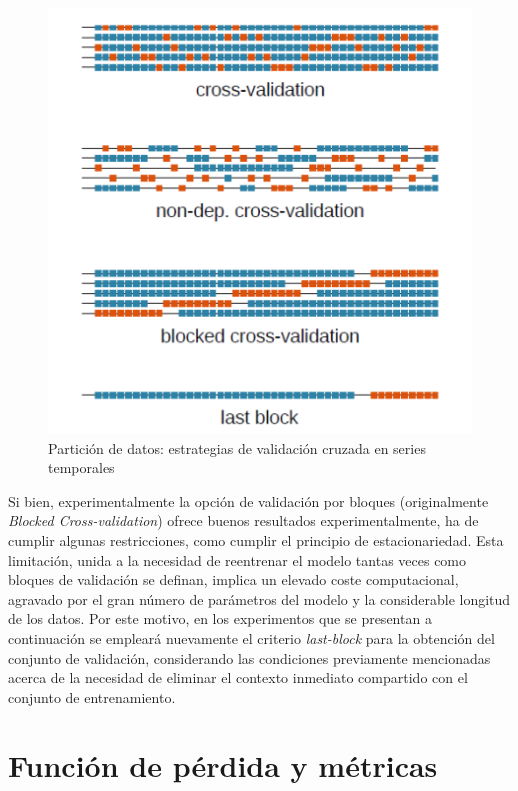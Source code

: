 \begin{figure}[!ht]
	\centering
	\includegraphics[scale=0.35]{img/valid}
	\caption{Partición de datos: estrategias de validación cruzada en series temporales \cite{bergmeir2012use}}
	\label{valid}
\end{figure}


Si bien, experimentalmente la opción de validación por bloques (originalmente \textit{Blocked Cross-validation}) ofrece buenos resultados experimentalmente, ha de cumplir algunas restricciones, como cumplir el principio de estacionariedad. Esta limitación, unida a la necesidad de reentrenar el modelo tantas veces como bloques de validación se definan, implica un elevado coste computacional, agravado por el gran número de parámetros del modelo y la considerable longitud de los datos. Por este motivo, en los experimentos que se presentan a continuación se empleará nuevamente el criterio \textit{last-block} para la obtención del conjunto de validación, considerando las condiciones previamente mencionadas acerca de la necesidad de eliminar el contexto inmediato compartido con el conjunto de entrenamiento.

\section{Función de pérdida y métricas}

